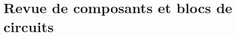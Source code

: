 \documentclass[english,french,12pt]{article}
\begin{document}
\section*{Revue de composants et blocs de circuits}
\raggedright
\raggedcolumns
\end{document}
